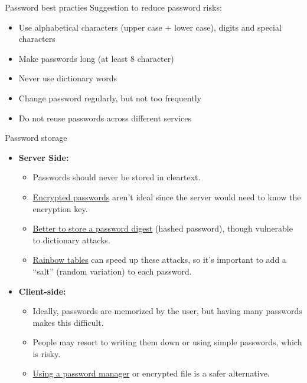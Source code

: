\begin{quotebox}[colframe=blue!10!white, colback=blue!5!white]{Password best practies}
    Suggestion to reduce password risks:
    \begin{itemize}
        \item Use alphabetical characters (upper case + lower case), digits and special characters
        \item Make passwords long (at least 8 character)
        \item Never use dictionary words
        \item Change password regularly, but not too frequently
        \item Do not reuse passwords across different services
    \end{itemize}
\end{quotebox}


\begin{quotebox}[colframe=blue!10!white, colback=blue!5!white]{Password storage}
    \begin{itemize}
        \item \textbf{Server Side:}
        \begin{itemize}
            \item Passwords should never be stored in cleartext.
            \item \underline{Encrypted passwords} aren't ideal since the server would need to know the encryption key.
            \item \underline{Better to store a password digest} (hashed password), though vulnerable to dictionary attacks.
            \item \underline{Rainbow tables} can speed up these attacks, so it’s important to add a “salt” (random variation) to each password.
        \end{itemize}
        \item \textbf{Client-side:}
        \begin{itemize}
            \item Ideally, passwords are memorized by the user, but having many passwords makes this difficult.
            \item People may resort to writing them down or using simple passwords, which is risky.
            \item \underline{Using a password manager} or encrypted file is a safer alternative.
        \end{itemize}
    \end{itemize}
\end{quotebox}


